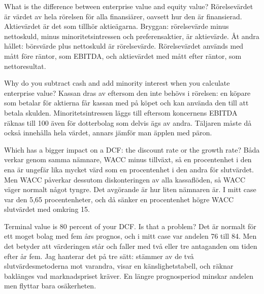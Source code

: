 \begin{fraga}{What is the difference between enterprise value and equity value?}
Rörelsevärdet är värdet av hela rörelsen för alla finansiärer, oavsett hur den är finansierad.
Aktievärdet är det som tillhör aktieägarna. Bryggan: rörelsevärde minus nettoskuld, minus
minoritetsintressen och preferensaktier, är aktievärde. Åt andra hållet: börsvärde plus
nettoskuld är rörelsevärde. Rörelsevärdet används med mått före räntor, som EBITDA, och
aktievärdet med mått efter räntor, som nettoresultat.
\end{fraga}

\begin{fraga}{Why do you subtract cash and add minority interest when you calculate enterprise value?}
Kassan dras av eftersom den inte behövs i rörelsen: en köpare som betalar för aktierna får
kassan med på köpet och kan använda den till att betala skulden. Minoritetsintressen läggs
till eftersom koncernens EBITDA räknas till 100\pct{} även för dotterbolag som delvis ägs av
andra. Täljaren måste då också innehålla hela värdet, annars jämför man äpplen med päron.
\end{fraga}

\begin{fraga}{Which has a bigger impact on a DCF: the discount rate or the growth rate?}
Båda verkar genom samma nämnare, WACC minus tillväxt, så en procentenhet i den ena är ungefär
lika mycket värd som en procentenhet i den andra för slutvärdet. Men WACC påverkar dessutom
diskonteringen av alla kassaflöden, så WACC väger normalt något tyngre. Det avgörande är hur
liten nämnaren är. I mitt case var den 5,65 procentenheter, och då sänker en procentenhet högre
WACC slutvärdet med omkring 15\pct.
\end{fraga}

\begin{fraga}{Terminal value is 80 percent of your DCF. Is that a problem?}
Det är normalt för ett moget bolag med fem års prognos, och i mitt case var andelen 76 till
84\pct. Men det betyder att värderingen står och faller med två eller tre antaganden om tiden
efter år fem. Jag hanterar det på tre sätt: stämmer av de två slutvärdesmetoderna mot varandra,
visar en känslighetstabell, och räknar baklänges vad marknadspriset kräver. En längre
prognosperiod minskar andelen men flyttar bara osäkerheten.
\end{fraga}

